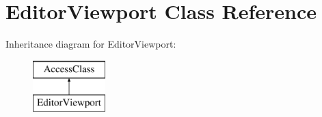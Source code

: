 \hypertarget{classEditorViewport}{\section{Editor\-Viewport Class Reference}
\label{classEditorViewport}
}
Inheritance diagram for Editor\-Viewport\-:\begin{figure}[H]
\begin{center}
\leavevmode
\includegraphics[height=2.000000cm]{classEditorViewport}
\end{center}
\end{figure}

